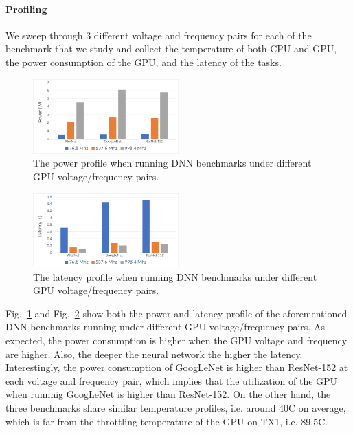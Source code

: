 \paragraph{Profiling}

We sweep through 3 different voltage and frequency pairs for each of the benchmark that we study and collect the temperature of both CPU and GPU, the power consumption of the GPU, and the latency of the tasks.

\begin{figure}[h]
    \centering
    \includegraphics[width=0.5\textwidth]{power_profile.png}
    \caption{The power profile when running DNN benchmarks under different GPU voltage/frequency pairs.}\label{fig:1}
\end{figure}

\begin{figure}[h]
    \centering
    \includegraphics[width=0.5\textwidth]{latency_profile.png}
    \caption{The latency profile when running DNN benchmarks under different GPU voltage/frequency pairs.}\label{fig:2}
\end{figure}

Fig.~\ref{fig:1} and Fig.~\ref{fig:2} show both the power and latency profile of the aforementioned DNN benchmarks running under different GPU voltage/frequency pairs. As expected, the power consumption is higher when the GPU voltage and frequency are higher. Also, the deeper the neural network the higher the latency. Interestingly, the power consumption of GoogLeNet is higher than ResNet-152 at each voltage and frequency pair, which implies that the utilization of the GPU when runnnig GoogLeNet is higher than ResNet-152. On the other hand, the three benchmarks share similar temperature profiles, i.e. around 40C on average, which is far from the throttling temperature of the GPU on TX1, i.e. 89.5C.

